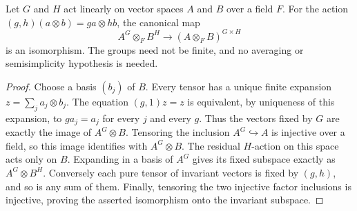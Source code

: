 \begin{lemma}
\label{lem:independent-tensor-invariants}
\leanok
Let $G$ and $H$ act linearly on vector spaces $A$ and $B$ over a field $F$.
For the action $(g,h)(a\otimes b)=ga\otimes hb$, the canonical map
\[
 A^G\otimes_F B^H\longrightarrow(A\otimes_F B)^{G\times H}
\]
is an isomorphism. The groups need not be finite, and no averaging or
semisimplicity hypothesis is needed.
\end{lemma}
\begin{proof}
Choose a basis $(b_j)$ of $B$. Every tensor has a unique finite expansion
$z=\sum_j a_j\otimes b_j$. The equation $(g,1)z=z$ is equivalent, by
uniqueness of this expansion, to $ga_j=a_j$ for every $j$ and every $g$.
Thus the vectors fixed by $G$ are exactly the image of $A^G\otimes B$.
Tensoring the inclusion $A^G\hookrightarrow A$ is injective over a field,
so this image identifies with $A^G\otimes B$. The residual $H$-action
on this space acts only on $B$. Expanding in a basis of $A^G$ gives its
fixed subspace exactly as $A^G\otimes B^H$. Conversely each pure tensor
of invariant vectors is fixed by $(g,h)$, and so is any sum of them.
Finally, tensoring the two injective factor inclusions is injective,
proving the asserted isomorphism onto the invariant subspace.
\end{proof}

